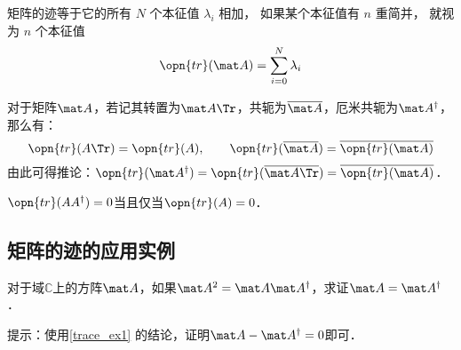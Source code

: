 \begin{theorem}{}
矩阵的迹等于它的所有 $N$ 个本征值 $\lambda_i$ 相加， 如果某个本征值有 $n$ 重简并， 就视为 $n$ 个本征值
\begin{equation}
\opn{tr}(\mat A) = \sum_{i=0}^N \lambda_i
\end{equation}
\end{theorem}


\begin{exercise}{}\label{trace_exe1}
对于矩阵$\mat A$，若记其转置为$\mat A\Tr$，共轭为$\overline{\mat A}$，厄米共轭为$\mat A^\dagger$，那么有：
\begin{equation}
\opn{tr}(A\Tr)=\opn{tr}(A), \qquad \opn{tr}(\overline{\mat A})=\overline{\opn{tr}(\mat A)}
\end{equation}
由此可得推论：$\opn{tr}(\mat A^\dagger)=\opn{tr}(\overline{\mat A\Tr})=\overline{\opn{tr}(\mat A)}$．
\end{exercise}

\begin{example}{}\label{trace_ex1}
$\opn{tr}(AA^\dagger)=0$当且仅当$\opn{tr}(A)=0$．
\end{example}

\subsection{矩阵的迹的应用实例}

\begin{exercise}{}
对于域$\mathbb{C}$上的方阵$\mat A$，如果$\mat A^2=\mat A\mat A^\dagger$，求证$\mat A=\mat A^\dagger$．

提示：使用\autoref{trace_ex1} 的结论，证明$\mat A-\mat A^\dagger=0$即可．
\end{exercise}

